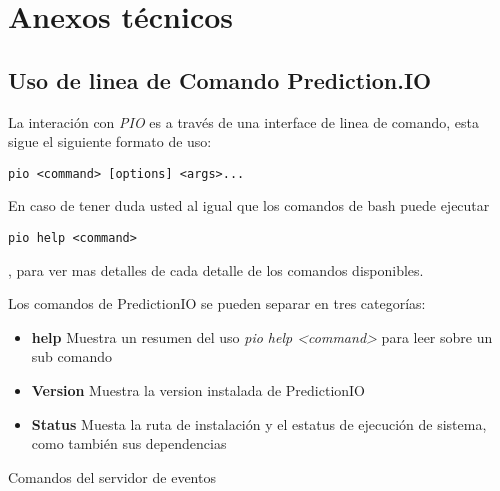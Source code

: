 \chapter{Anexos técnicos}
\label{ch:anexo-a}


\section{Uso de linea de Comando Prediction.IO}


La interación con \emph{PIO} es a través de una interface de linea de comando, esta sigue el siguiente formato de uso:

 

\begin{lstlisting}[frame=single,basicstyle=\ttfamily\tiny,]
  pio <command> [options] <args>...
\end{lstlisting}



En caso de tener duda usted al igual que los comandos de bash puede ejecutar

\begin{lstlisting}[frame=single,basicstyle=\ttfamily\tiny,]
pio help <command> 
\end{lstlisting}, para ver mas detalles de cada detalle de los comandos disponibles.


Los comandos de PredictionIO se pueden separar en tres categorías:

\begin{itemize}
	\item \textbf{help} Muestra un resumen del uso  \emph{pio help <command>} para leer sobre un sub comando
	
	\item \textbf{Version} Muestra la version instalada de PredictionIO
	
	
	\item \textbf{Status} Muesta la ruta de instalación y el estatus de ejecución de sistema, como también sus dependencias
	
\end{itemize}

Comandos del servidor de eventos



